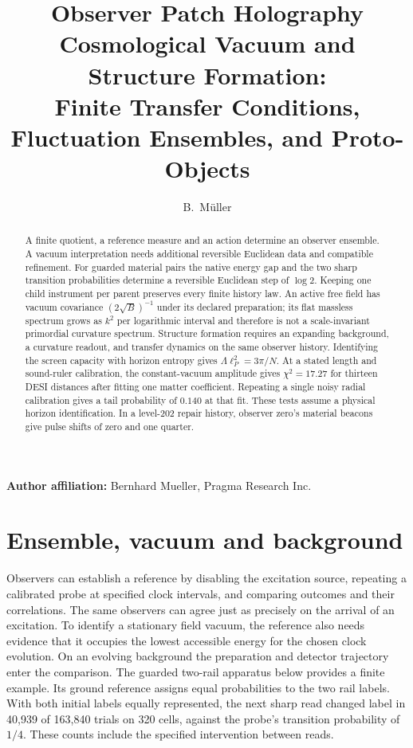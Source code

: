 \documentclass[11pt]{article}
\title{Observer Patch Holography Cosmological Vacuum and Structure Formation:\\
Finite Transfer Conditions, Fluctuation Ensembles, and Proto-Objects}
\author{B.\ M\"uller}
\date{\OPHPaperReleaseDate}
\theoremstyle{remark}
\theoremstyle{plain}
\begin{document}
\maketitle
\OPHPaperReleaseBanner

\begin{center}
\small\textbf{Author affiliation:} Bernhard Mueller, Pragma Research Inc.
\end{center}

\begin{abstract}
A finite quotient, a reference measure and an action determine an observer
ensemble. A vacuum interpretation needs additional reversible Euclidean
data and compatible refinement. For guarded material pairs the native energy gap and the two sharp transition
probabilities determine a reversible Euclidean step of \(\log 2\).
Keeping one child instrument per parent preserves every finite history law. An active free field
has vacuum covariance \((2\sqrt B)^{-1}\) under its declared preparation;
its flat massless spectrum grows as \(k^2\) per logarithmic interval and
therefore is not a scale-invariant primordial curvature spectrum.
Structure formation requires an expanding background, a curvature readout,
and transfer dynamics on the same observer history. Identifying the screen
capacity with horizon entropy gives \(\Lambda\ell_P^2=3\pi/N\).
At a stated length and sound-ruler calibration, the constant-vacuum
amplitude gives $\chi^2=17.27$ for thirteen DESI distances after fitting
one matter coefficient. Repeating a single noisy radial calibration
gives a tail probability of $0.140$ at that fit. These tests assume a
physical horizon identification. In a level-202 repair history, observer zero's material
beacons give pulse shifts of zero and one quarter.

\end{abstract}



\section{Ensemble, vacuum and background}
Observers can establish a reference by disabling the excitation source,
repeating a calibrated probe at specified clock intervals, and comparing
outcomes and their correlations. The same observers can agree just as
precisely on the arrival of an excitation. To identify a stationary field
vacuum, the reference also needs evidence that it occupies the lowest
accessible energy for the chosen clock evolution. On an evolving background
the preparation and detector trajectory enter the comparison.
The guarded two-rail apparatus below provides a finite example.
Its ground reference assigns equal probabilities to the two rail labels.
With both initial labels equally represented, the next sharp read changed
label in 40,939 of 163,840 trials on 320 cells, against the probe's
transition probability of $1/4$. These counts include the specified
intervention between reads.
\end{document}
